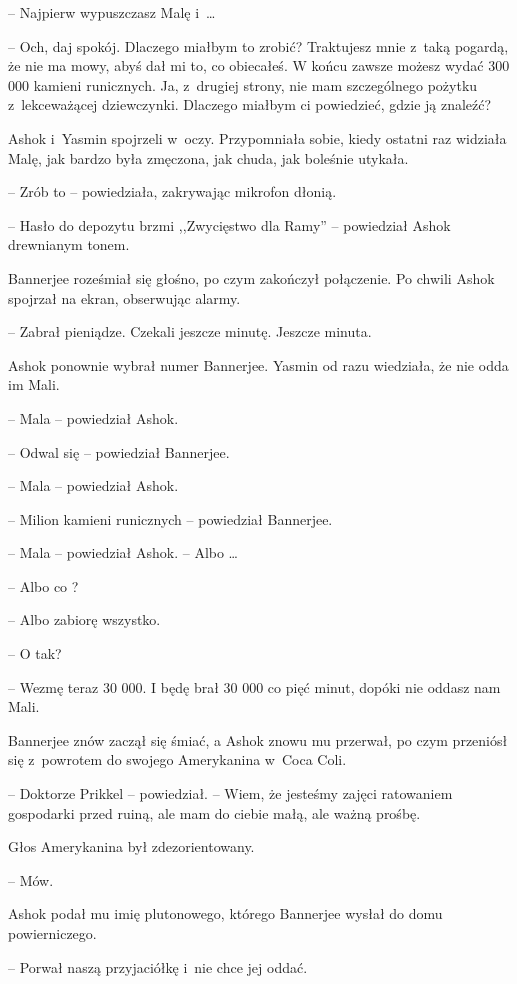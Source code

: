 \documentclass[oneside,polish,11pt,rmheadings]{mwbk}
\begin{document}
-- Najpierw wypuszczasz Malę i~\ldots 

-- Och, daj spokój. Dlaczego miałbym to zrobić? Traktujesz mnie z~taką pogardą, że nie ma mowy, abyś dał mi to, co obiecałeś. W końcu zawsze możesz wydać 300 000 kamieni runicznych. Ja, z~drugiej strony, nie mam szczególnego pożytku z~lekceważącej dziewczynki. Dlaczego miałbym ci powiedzieć, gdzie ją znaleźć?

Ashok i~Yasmin spojrzeli w~oczy. Przypomniała sobie, kiedy ostatni raz widziała Malę, jak bardzo była zmęczona, jak chuda, jak boleśnie utykała. 

-- Zrób to -- powiedziała, zakrywając mikrofon dłonią.

-- Hasło do depozytu brzmi ,,Zwycięstwo dla Ramy'' -- powiedział Ashok drewnianym tonem.

Bannerjee roześmiał się głośno, po czym zakończył połączenie. Po chwili Ashok spojrzał na ekran, obserwując alarmy. 

-- Zabrał pieniądze. Czekali jeszcze minutę. Jeszcze minuta.

Ashok ponownie wybrał numer Bannerjee. Yasmin od razu wiedziała, że nie odda im Mali.

-- Mala -- powiedział Ashok.

-- Odwal się -- powiedział Bannerjee.

-- Mala -- powiedział Ashok.

-- Milion kamieni runicznych -- powiedział Bannerjee.

-- Mala -- powiedział Ashok. -- Albo \ldots 

-- Albo co ?

-- Albo zabiorę wszystko.

-- O tak? 

-- Wezmę teraz 30 000. I będę brał 30 000 co pięć minut, dopóki nie oddasz nam Mali.

Bannerjee znów zaczął się śmiać, a Ashok znowu mu przerwał, po czym przeniósł się z~powrotem do swojego Amerykanina w~Coca Coli.

-- Doktorze Prikkel -- powiedział. -- Wiem, że jesteśmy zajęci ratowaniem gospodarki przed ruiną, ale mam do ciebie małą, ale ważną prośbę.

Głos Amerykanina był zdezorientowany. 

-- Mów.

Ashok podał mu imię plutonowego, którego Bannerjee wysłał do domu powierniczego. 

-- Porwał naszą przyjaciółkę i~nie chce jej oddać.
\end{document}
